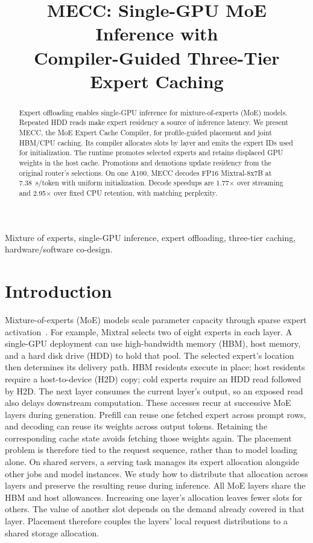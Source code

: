 \documentclass[conference,9pt,letterpaper]{IEEEtran}
\title{MECC: Single-GPU MoE Inference with\protect\\Compiler-Guided Three-Tier Expert Caching}
\author{}
\begin{document}
\maketitle\raggedbottom
\balance
\begin{abstract}
Expert offloading enables single-GPU inference for mixture-of-experts (MoE) models. Repeated HDD reads make expert residency a source of inference latency. We present MECC, the MoE Expert Cache Compiler, for profile-guided placement and joint HBM/CPU caching. Its compiler allocates slots by layer and emits the expert IDs used for initialization. The runtime promotes selected experts and retains displaced GPU weights in the host cache. Promotions and demotions update residency from the original router's selections. On one A100, MECC decodes FP16 Mixtral-8x7B at 7.38~s/token with uniform initialization. Decode speedups are 1.77$\times$ over streaming and 2.95$\times$ over fixed CPU retention, with matching perplexity.
\end{abstract}

\begin{IEEEkeywords}
Mixture of experts, single-GPU inference, expert offloading, three-tier caching, hardware/software co-design.
\end{IEEEkeywords}

\section{Introduction}
Mixture-of-experts (MoE) models scale parameter capacity through sparse expert activation~\cite{shazeer,switch,mixtral,deepseekmoe}. For example, Mixtral selects two of eight experts in each layer. A single-GPU deployment can use high-bandwidth memory (HBM), host memory, and a hard disk drive (HDD) to hold that pool. The selected expert's location then determines its delivery path. HBM residents execute in place; host residents require a host-to-device (H2D) copy; cold experts require an HDD read followed by H2D. The next layer consumes the current layer's output, so an exposed read also delays downstream computation. These accesses recur at successive MoE layers during generation. Prefill can reuse one fetched expert across prompt rows, and decoding can reuse its weights across output tokens. Retaining the corresponding cache state avoids fetching those weights again. The placement problem is therefore tied to the request sequence, rather than to model loading alone. On shared servers, a serving task manages its expert allocation alongside other jobs and model instances. We study how to distribute that allocation across layers and preserve the resulting reuse during inference. All MoE layers share the HBM and host allowances. Increasing one layer's allocation leaves fewer slots for others. The value of another slot depends on the demand already covered in that layer. Placement therefore couples the layers' local request distributions to a shared storage allocation.
\end{document}
